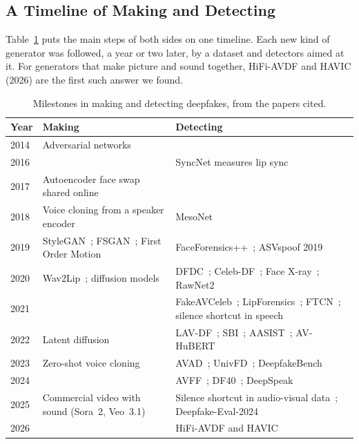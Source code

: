 \subsection{A Timeline of Making and Detecting}

Table~\ref{tab:timeline} puts the main steps of both sides on one timeline.
Each new kind of generator was followed, a year or two later, by a dataset
and detectors aimed at it. For generators that make picture and sound
together, HiFi-AVDF and HAVIC (2026) are the first such answer we found.

\begin{table}[ht]
    \centering
    \small
    \caption{Milestones in making and detecting deepfakes, from the papers cited.}
    \label{tab:timeline}
    \begin{tabularx}{\textwidth}{@{}l >{\raggedright\arraybackslash}X >{\raggedright\arraybackslash}X@{}}
        \toprule
        \textbf{Year} & \textbf{Making} & \textbf{Detecting} \\
        \midrule
        2014 & Adversarial networks~\cite{gan} & \\
        2016 & & SyncNet measures lip sync~\cite{syncnet} \\
        2017 & Autoencoder face swap shared online~\cite{mirsky} & \\
        2018 & Voice cloning from a speaker encoder~\cite{sv2tts} & MesoNet~\cite{mesonet} \\
        2019 & StyleGAN~\cite{stylegan}; FSGAN~\cite{fsgan}; First Order Motion~\cite{fomm} & FaceForensics++~\cite{ffpp}; ASVspoof 2019~\cite{asvspoof2019} \\
        2020 & Wav2Lip~\cite{wav2lip}; diffusion models~\cite{ddpm} & DFDC~\cite{dfdc}; Celeb-DF~\cite{celebdf}; Face X-ray~\cite{facexray}; RawNet2~\cite{rawnet2} \\
        2021 & & FakeAVCeleb~\cite{fakeavceleb}; LipForensics~\cite{lipforensics}; FTCN~\cite{ftcn}; silence shortcut in speech~\cite{mueller2021} \\
        2022 & Latent diffusion~\cite{ldm} & LAV-DF~\cite{lavdf}; SBI~\cite{sbi}; AASIST~\cite{aasist}; AV-HuBERT~\cite{avhubert} \\
        2023 & Zero-shot voice cloning~\cite{valle} & AVAD~\cite{avad}; UnivFD~\cite{univfd}; DeepfakeBench~\cite{deepfakebench} \\
        2024 & & AVFF~\cite{avff}; DF40~\cite{df40}; DeepSpeak~\cite{deepspeak} \\
        2025 & Commercial video with sound (Sora~2, Veo~3.1) & Silence shortcut in audio-visual data~\cite{smeu2025}; Deepfake-Eval-2024~\cite{dfeval2024} \\
        2026 & & HiFi-AVDF and HAVIC~\cite{havic} \\
        \bottomrule
    \end{tabularx}
\end{table}

